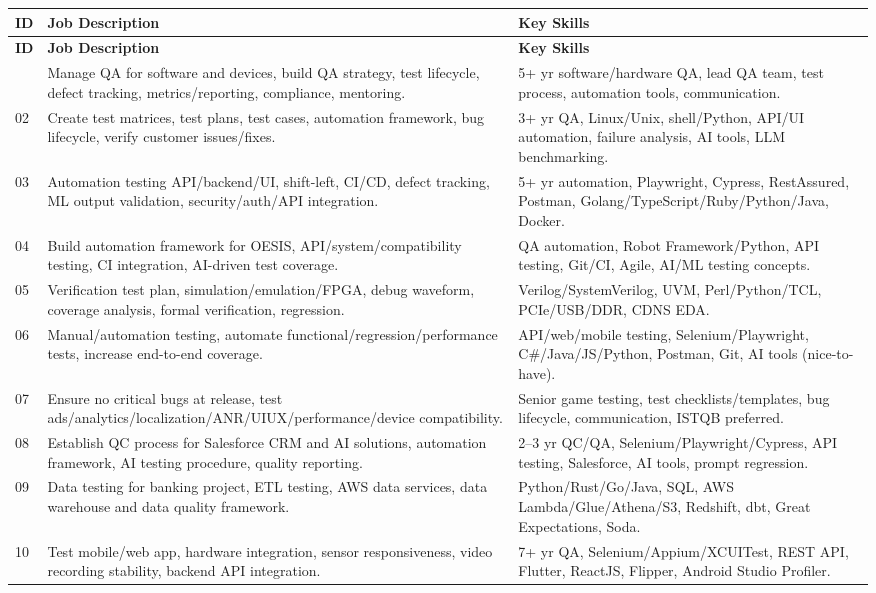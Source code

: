\documentclass[12pt, a4paper]{article}
\begin{document}
\begin{longtable}{@{} C{0.7cm} L{5.8cm} L{7.5cm} @{}}
\toprule
{}
\textbf{ID} & \textbf{Job Description} & \textbf{Key Skills} \\
\midrule
\endfirsthead
\toprule
{}
\textbf{ID} & \textbf{Job Description} & \textbf{Key Skills} \\
\midrule
\endhead
\bottomrule
{} & Manage QA for software and devices, build QA strategy, test lifecycle, defect tracking, metrics/reporting, compliance, mentoring. & 5+ yr software/hardware QA, lead QA team, test process, automation tools, communication. \\
02 & Create test matrices, test plans, test cases, automation framework, bug lifecycle, verify customer issues/fixes. & 3+ yr QA, Linux/Unix, shell/Python, API/UI automation, failure analysis, AI tools, LLM benchmarking. \\
03 & Automation testing API/backend/UI, shift-left, CI/CD, defect tracking, ML output validation, security/auth/API integration. & 5+ yr automation, Playwright, Cypress, RestAssured, Postman, Golang/TypeScript/Ruby/Python/Java, Docker. \\
04 & Build automation framework for OESIS, API/system/compatibility testing, CI integration, AI-driven test coverage. & QA automation, Robot Framework/Python, API testing, Git/CI, Agile, AI/ML testing concepts. \\
05 & Verification test plan, simulation/emulation/FPGA, debug waveform, coverage analysis, formal verification, regression. & Verilog/SystemVerilog, UVM, Perl/Python/TCL, PCIe/USB/DDR, CDNS EDA. \\
06 & Manual/automation testing, automate functional/regression/performance tests, increase end-to-end coverage. & API/web/mobile testing, Selenium/Playwright, C\#/Java/JS/Python, Postman, Git, AI tools (nice-to-have). \\
07 & Ensure no critical bugs at release, test ads/analytics/localization/ANR/UI\-UX/performance/device compatibility. & Senior game testing, test checklists/templates, bug lifecycle, communication, ISTQB preferred. \\
08 & Establish QC process for Salesforce CRM and AI solutions, automation framework, AI testing procedure, quality reporting. & 2--3 yr QC/QA, Selenium/Playwright/Cypress, API testing, Salesforce, AI tools, prompt regression. \\
09 & Data testing for banking project, ETL testing, AWS data services, data warehouse and data quality framework. & Python/Rust/Go/Java, SQL, AWS Lambda/Glue/Athena/S3, Redshift, dbt, Great Expectations, Soda. \\
10 & Test mobile/web app, hardware integration, sensor responsiveness, video recording stability, backend API integration. & 7+ yr QA, Selenium/Appium/XCUITest, REST API, Flutter, ReactJS, Flipper, Android Studio Profiler. \\
\bottomrule
\end{longtable}
\end{document}
